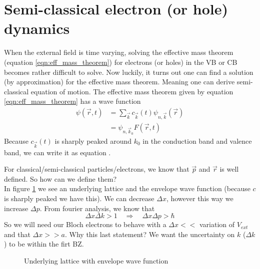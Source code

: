 \section{Semi-classical electron (or hole) dynamics}
When the external field is time varying, solving the effective mass theorem (equation \ref{eqn:eff_mass_theorem}) for electrons (or holes) in the VB or CB becomes rather difficult to solve. Now luckily, it turns out one can find a solution (by approximation) for the effective mass theorem. Meaning one can derive semi-classical equation of motion.
The effective mass theorem given by equation \ref{eqn:eff_mass_theorem} has a wave function
\begin{align}
	\psi(\vec{r}, t) &= \sum_{\vec{k}}^{}c_{\vec{k}}(t)\psi_{n, \vec{k}}(\vec{r}) \\
	&= \psi_{n, \vec{k}_0}F(\vec{r}, t) \label{eqn:simplification_peak}
\end{align}
Because $c_{\vec{k}}(t)$ is sharply peaked around $k_0$ in the conduction band and valence band, we can write it as equation \label{eqn:simplification_peak}.\\ \par
For classical/semi-classical particles/electrons, we know that $\vec{p}$ and $\vec{r}$ is well defined. So how can we define them?\\
In figure \ref{fig:particles_lattice_semi} we see an underlying lattice and the envelope wave function (because $c$ is sharply peaked we have this). We can decrease $\Delta x$, however this way we increase $\Delta p$. From fourier analysis, we know that
\begin{equation}
	\Delta x \Delta k > 1 \quad \Rightarrow \quad \Delta x \Delta p > \hbar
\end{equation}
So we will need our Bloch electrons to behave with a $\Delta x <<$ variation of $V_{ext}$ and that $\Delta x >> a$. Why this last statement? We want the uncertainty on $k$ ($\Delta k$) to be within the firt BZ.
\begin{figure}
	\centering
	\caption{Underlying lattice with envelope wave function}
	\label{fig:particles_lattice_semi}
\end{figure}

